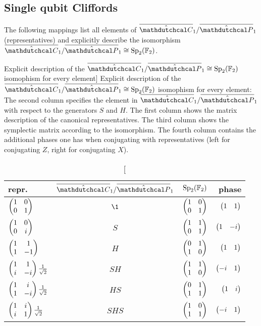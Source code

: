 \documentclass[a4paper,english]{scrartcl}
\begin{document}
\subsection{Single qubit Cliffords}

\begin{proposition}
The following mappings list all elements of $\ouic_1/\ouip_1$ (representatives) and
explicitly describe the isomorphism $\ouic_1/\ouip_1 \cong \Sp_{2}\w(\F_2)$.
\begin{table}[H]\label{t"single_qubit_isomorphism}
\center
\caption
[Explicit description of the $\ouic_1/\ouip_1 \cong \Sp_{2}\w(\F_2)$ isomophism for
every element]
{Explicit description of the $\ouic_1/\ouip_1 \cong \Sp_{2}\w(\F_2)$ isomophism for every
element: The second column specifies the element in $\ouic_1/\ouip_1$ with respect to
the generators $S$ and $H$. The first column shows the matrix description of the
canonical representatives. The third column shows the symplectic matrix according to the
isomorphism. The fourth column contains the additional phases one has when conjugating
with representatives (left for conjugating $Z$, right for conjugating $X$).}
\begin{tabular}{lccr}
  \toprule
  repr. & $\ouic_1/\ouip_1$ & $\Sp_{2}\w(\F_2)$ & phase\\
  \midrule
  $\begin{pmatrix}1&0\\0&1\end{pmatrix}$ & $\1$ & $\begin{pmatrix}1&0\\0&1\end{pmatrix}$ & $\begin{pmatrix}1&1\end{pmatrix}$\\
  \midrule
  $\begin{pmatrix}1&0\\0&i\end{pmatrix}$ & $S$ & $\begin{pmatrix}1&1\\0&1\end{pmatrix}$ & $\begin{pmatrix}1&-i\end{pmatrix}$\\
  \midrule
  $\begin{pmatrix}1&1\\1&-1\end{pmatrix}$ & $H$ & $\begin{pmatrix}0&1\\1&0\end{pmatrix}$ & $\begin{pmatrix}1&1\end{pmatrix}$\\
  \midrule
  $\begin{pmatrix}1&1\\i&-i\end{pmatrix}\frac{1}{\sqrt{2}}$ & $SH$ & $\begin{pmatrix}1&1\\1&0\end{pmatrix}$ & $\begin{pmatrix}-i&1\end{pmatrix}$\\
  \midrule
  $\begin{pmatrix}1&i\\1&-i\end{pmatrix}\frac{1}{\sqrt{2}}$ & $HS$ & $\begin{pmatrix}0&1\\1&1\end{pmatrix}$ & $\begin{pmatrix}1&i\end{pmatrix}$\\
  \midrule
  $\begin{pmatrix}1&i\\i&1\end{pmatrix}\frac{1}{\sqrt{2}}$ & $SHS$ & $\begin{pmatrix}1&0\\1&1\end{pmatrix}$ & $\begin{pmatrix}-i&1\end{pmatrix}$\\
  \bottomrule
\end{tabular}
\end{table}
\end{proposition}
\end{document}
